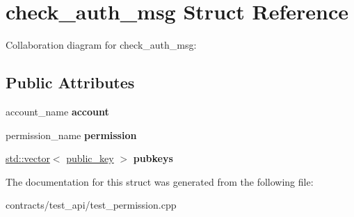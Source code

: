 \hypertarget{structcheck__auth__msg}{}\section{check\+\_\+auth\+\_\+msg Struct Reference}
\label{structcheck__auth__msg}


Collaboration diagram for check\+\_\+auth\+\_\+msg\+:
\subsection*{Public Attributes}
\begin{DoxyCompactItemize}
\item 
\mbox{\label{structcheck__auth__msg_aff4e575cc21629edf56ddd20bd80d849}} 
account\+\_\+name {\bfseries account}
\item 
\mbox{\label{structcheck__auth__msg_a09aa8655dadac9f474521b7edf63a45c}} 
permission\+\_\+name {\bfseries permission}
\item 
\mbox{\label{structcheck__auth__msg_a941652ec676a6d6bae92f2d2d5ed93a0}} 
\mbox{\hyperlink{classstd_1_1vector}{std\+::vector}}$<$ \mbox{\hyperlink{structaacio_1_1public__key}{public\+\_\+key}} $>$ {\bfseries pubkeys}
\end{DoxyCompactItemize}


The documentation for this struct was generated from the following file\+:\begin{DoxyCompactItemize}
\item 
contracts/test\+\_\+api/test\+\_\+permission.\+cpp\end{DoxyCompactItemize}
